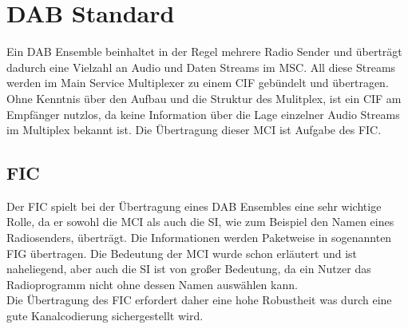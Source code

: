 \chapter{DAB Standard}

Ein DAB Ensemble beinhaltet in der Regel mehrere Radio Sender und überträgt dadurch eine Vielzahl an Audio und Daten Streams im \ac{MSC}. All diese Streams werden im Main Service Multiplexer zu einem \ac{CIF} gebündelt und übertragen. Ohne Kenntnis über den Aufbau und die Struktur des Mulitplex, ist ein \ac{CIF} am Empfänger nutzlos, da keine Information über die Lage einzelner Audio Streams im Multiplex bekannt ist. Die Übertragung dieser \ac{MCI} ist Aufgabe des \ac{FIC}.

\section{FIC}
\label{sec:FIC}
Der \ac{FIC} spielt bei der Übertragung eines DAB Ensembles eine sehr wichtige Rolle, da er sowohl die \ac{MCI} als auch die \ac{SI}, wie zum Beispiel den Namen eines Radiosenders, überträgt. Die Informationen werden Paketweise in sogenannten \ac{FIG} übertragen. Die Bedeutung der \ac{MCI} wurde schon erläutert und ist naheliegend, aber auch die \ac{SI} ist von großer Bedeutung, da ein Nutzer das Radioprogramm nicht ohne dessen Namen auswählen kann. \\
Die Übertragung des FIC erfordert daher eine hohe Robustheit was durch eine gute Kanalcodierung sichergestellt wird.
\begin{figure} [h]
\begin{center}
\end{center}
\end{figure}

